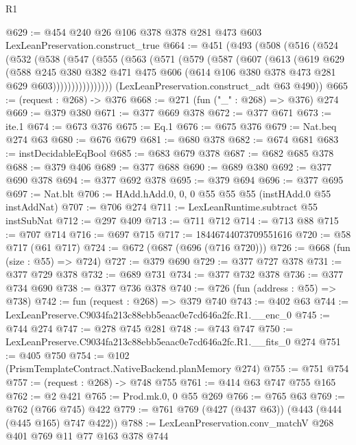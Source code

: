 \begin{lexlean}{R1}
\begin{coremodule}
@629 := @454 @240 @26 @106 @378 @378 @281 @473 @603 LexLeanPreservation.construct_true
@664 := @451
    (@493
      (@508
        (@516
          (@524
            (@532
              (@538
                (@547
                  (@555
                    (@563
                      (@571
                        (@579
                          (@587
                            (@607
                              (@613
                                (@619
                                  @629
                                  (@588
                                    @245
                                    @380
                                    @382
                                    @471
                                    @475
                                    @606
                                    (@614 @106 @380 @378 @473 @281 @629 @603))))))))))))))))
      (LexLeanPreservation.construct_adt @63 @490))
@665 := (request : @268) -> @376
@668 := @271 (fun ("_" : @268) => @376) @274
@669 := @379 @380
@671 := @377 @669 @378
@672 := @377 @671
@673 := ite.{1}
@674 := @673 @376
@675 := Eq.{1}
@676 := @675 @376
@679 := Nat.beq @274 @63
@680 := @676 @679
@681 := @680 @378
@682 := @674 @681
@683 := instDecidableEqBool
@685 := @683 @679 @378
@687 := @682 @685 @378
@688 := @379 @406
@689 := @377 @688
@690 := @689 @380
@692 := @377 @690 @378
@694 := @377 @692 @378
@695 := @379 @694
@696 := @377 @695
@697 := Nat.blt
@706 := HAdd.hAdd.{0, 0, 0} @55 @55 @55 (instHAdd.{0} @55 instAddNat)
@707 := @706 @274
@711 := LexLeanRuntime.subtract @55 instSubNat
@712 := @297 @409
@713 := @711 @712
@714 := @713 @88
@715 := @707 @714
@716 := @697 @715
@717 := 18446744073709551616
@720 := @58 @717 (@61 @717)
@724 := @672 (@687 (@696 (@716 @720)))
@726 := @668 (fun (size : @55) => @724)
@727 := @379 @690
@729 := @377 @727 @378
@731 := @377 @729 @378
@732 := @689 @731
@734 := @377 @732 @378
@736 := @377 @734 @690
@738 := @377 @736 @378
@740 := @726 (fun (address : @55) => @738)
@742 := fun (request : @268) => @379 @740
@743 := @402 @63
@744 := LexLeanPreserve.C9034fa213c88ebb5eaac0e7cd646a2fc.R1.__enc_0
@745 := @744 @274
@747 := @278 @745 @281
@748 := @743 @747
@750 := LexLeanPreserve.C9034fa213c88ebb5eaac0e7cd646a2fc.R1.__fits_0 @274
@751 := @405 @750
@754 := @102 (PrismTemplateContract.NativeBackend.planMemory @274)
@755 := @751 @754
@757 := (request : @268) -> @748 @755
@761 := @414 @63 @747 @755 @165
@762 := @2 @421
@765 := Prod.mk.{0, 0} @55 @269
@766 := @765 @63
@769 := @762 (@766 @745) @422
@779 := @761 @769 (@427 (@437 @63)) (@443 (@444 (@445 @165) @747 @422))
@788 := LexLeanPreservation.conv_matchV @268 @401 @769 @11 @77 @163 @378 @744

\end{coremodule}
\end{lexlean}
